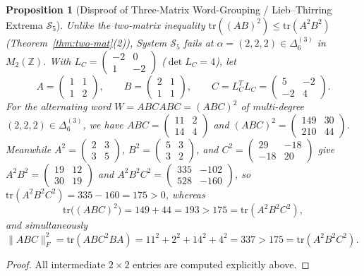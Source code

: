 \documentclass[11pt,a4paper]{article}
\newtheorem{proposition}[theorem]{Proposition}
\theoremstyle{definition}
\theoremstyle{remark}
\newcommand{\tr}{\mathrm{tr}}
\newcommand{\DeltaLat}{\Delta}
\begin{document}
\begin{proposition}[Disproof of Three-Matrix Word-Grouping / Lieb--Thirring Extrema $\mathcal{S}_5$]\label{prop:lt3}
Unlike the two-matrix inequality $\tr((AB)^2) \le \tr(A^2 B^2)$ (Theorem~\ref{thm:two-mat}(2)), System $\mathcal{S}_5$ fails at $\alpha = (2, 2, 2) \in \DeltaLat_6^{(3)}$ in $M_2(\mathbb{Z})$. With $L_C = \begin{pmatrix} -2 & 0 \\ 1 & -2 \end{pmatrix}$ ($\det L_C = 4$), let
\[
A = \begin{pmatrix} 1 & 1 \\ 1 & 2 \end{pmatrix}, \qquad
B = \begin{pmatrix} 2 & 1 \\ 1 & 1 \end{pmatrix}, \qquad
C = L_C^T L_C = \begin{pmatrix} 5 & -2 \\ -2 & 4 \end{pmatrix}.
\]
For the alternating word $W = A B C A B C = (ABC)^2$ of multi-degree $(2, 2, 2) \in \DeltaLat_6^{(3)}$, we have $ABC = \begin{pmatrix} 11 & 2 \\ 14 & 4 \end{pmatrix}$ and $(ABC)^2 = \begin{pmatrix} 149 & 30 \\ 210 & 44 \end{pmatrix}$. Meanwhile $A^2 = \begin{pmatrix} 2 & 3 \\ 3 & 5 \end{pmatrix}$, $B^2 = \begin{pmatrix} 5 & 3 \\ 3 & 2 \end{pmatrix}$, and $C^2 = \begin{pmatrix} 29 & -18 \\ -18 & 20 \end{pmatrix}$ give $A^2 B^2 = \begin{pmatrix} 19 & 12 \\ 30 & 19 \end{pmatrix}$ and $A^2 B^2 C^2 = \begin{pmatrix} 335 & -102 \\ 528 & -160 \end{pmatrix}$, so $\tr(A^2 B^2 C^2) = 335 - 160 = 175 > 0$, whereas
\[
\tr\bigl((ABC)^2\bigr) = 149 + 44 = 193 > 175 = \tr(A^2 B^2 C^2),
\]
and simultaneously $\|ABC\|_F^2 = \tr(A B C^2 B A) = 11^2 + 2^2 + 14^2 + 4^2 = 337 > 175 = \tr(A^2 B^2 C^2)$.
\end{proposition}
\begin{proof}
All intermediate $2 \times 2$ entries are computed explicitly above.
\end{proof}
\end{document}
